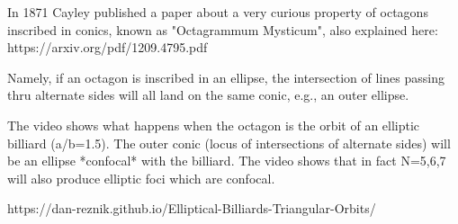 In 1871 Cayley published a paper about a very curious property of octagons inscribed in conics, known as "Octagrammum Mysticum", also explained here: https://arxiv.org/pdf/1209.4795.pdf

Namely, if an octagon is inscribed in an ellipse, the intersection of lines passing thru alternate sides will all land on the same conic, e.g., an outer ellipse. 

The video shows what happens when the octagon is the orbit of an elliptic billiard (a/b=1.5). The outer conic (locus of intersections of alternate sides) will be an ellipse *confocal* with the billiard. The video shows that in fact N=5,6,7 will also produce elliptic foci which are confocal.

https://dan-reznik.github.io/Elliptical-Billiards-Triangular-Orbits/